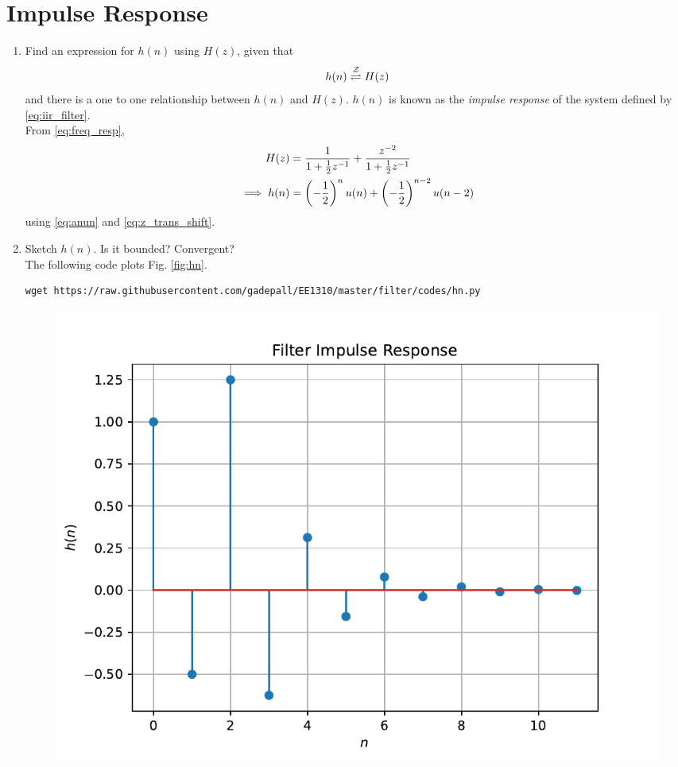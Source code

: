 \documentclass[journal,12pt,twocolumn]{IEEEtran}
\renewcommand\thesection{\arabic{section}}
\begin{document}
\section{Impulse Response}
\begin{enumerate}[label=\thesection.\arabic*]
\item \label{prob:impulse_resp}
Find an expression for $h(n)$ using $H(z)$, given that 
\begin{equation}
\label{eq:impulse_resp}
h(n) \overset{\mathcal{Z}}{ \rightleftharpoons} H(z)
\end{equation}
and there is a one to one relationship between $h(n)$ and $H(z)$. $h(n)$ is known as the {\em impulse response} of the
system defined by \eqref{eq:iir_filter}.
\\
\solution From \eqref{eq:freq_resp},
\begin{align}
H(z) &= \frac{1}{1 + \frac{1}{2}z^{-1}} + \frac{ z^{-2}}{1 + \frac{1}{2}z^{-1}}
\\
\implies h(n) &= \left(-\frac{1}{2}\right)^{n}u(n) + \left(-\frac{1}{2}\right)^{n-2}u(n-2)
\end{align}
using \eqref{eq:anun} and \eqref{eq:z_trans_shift}.
\item Sketch $h(n)$. Is it bounded? Convergent? 
\\
\solution The following code plots Fig. \ref{fig:hn}.
\begin{lstlisting}
wget https://raw.githubusercontent.com/gadepall/EE1310/master/filter/codes/hn.py
\end{lstlisting}
\begin{figure}[!ht]
\centering
\includegraphics[width=\columnwidth]{./figs/hn}

\end{figure}
\end{enumerate}
\end{document}
